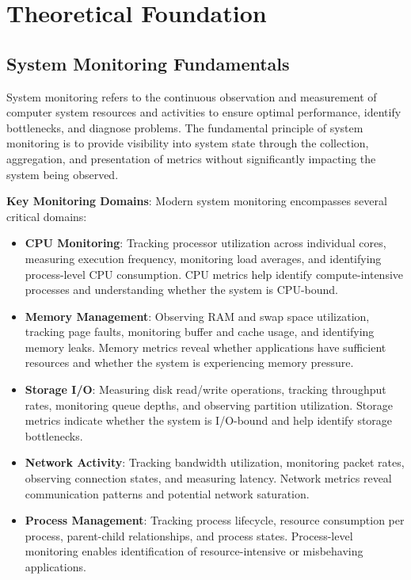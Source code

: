 \documentclass[12pt,a4paper,oneside]{report}
\begin{document}
\section{Theoretical Foundation}
\label{sec:theoretical-foundation}

\subsection{System Monitoring Fundamentals}

System monitoring refers to the continuous observation and measurement of computer system resources and activities to ensure optimal performance, identify bottlenecks, and diagnose problems. The fundamental principle of system monitoring is to provide visibility into system state through the collection, aggregation, and presentation of metrics without significantly impacting the system being observed.

\textbf{Key Monitoring Domains}: Modern system monitoring encompasses several critical domains:

\begin{itemize}
    \item \textbf{CPU Monitoring}: Tracking processor utilization across individual cores, measuring execution frequency, monitoring load averages, and identifying process-level CPU consumption. CPU metrics help identify compute-intensive processes and understanding whether the system is CPU-bound.
    
    \item \textbf{Memory Management}: Observing RAM and swap space utilization, tracking page faults, monitoring buffer and cache usage, and identifying memory leaks. Memory metrics reveal whether applications have sufficient resources and whether the system is experiencing memory pressure.
    
    \item \textbf{Storage I/O}: Measuring disk read/write operations, tracking throughput rates, monitoring queue depths, and observing partition utilization. Storage metrics indicate whether the system is I/O-bound and help identify storage bottlenecks.
    
    \item \textbf{Network Activity}: Tracking bandwidth utilization, monitoring packet rates, observing connection states, and measuring latency. Network metrics reveal communication patterns and potential network saturation.
    
    \item \textbf{Process Management}: Tracking process lifecycle, resource consumption per process, parent-child relationships, and process states. Process-level monitoring enables identification of resource-intensive or misbehaving applications.
\end{itemize}
\end{document}
